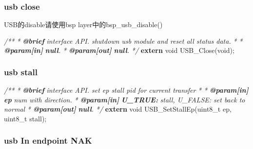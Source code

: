 \documentclass[
  12pt,
]{book}
\newenvironment{Shaded}{\begin{snugshade}}{\end{snugshade}}
\newcommand{\AnnotationTok}[1]{\textcolor[rgb]{0.56,0.35,0.01}{\textbf{\textit{#1}}}}
\newcommand{\CommentTok}[1]{\textcolor[rgb]{0.56,0.35,0.01}{\textit{#1}}}
\newcommand{\CommentVarTok}[1]{\textcolor[rgb]{0.56,0.35,0.01}{\textbf{\textit{#1}}}}
\newcommand{\DataTypeTok}[1]{\textcolor[rgb]{0.13,0.29,0.53}{#1}}
\newcommand{\KeywordTok}[1]{\textcolor[rgb]{0.13,0.29,0.53}{\textbf{#1}}}
\newcommand{\NormalTok}[1]{#1}
\begin{document}
\hypertarget{usb-close}{%
\subsubsection{usb close}\label{usb-close}}

USB的disable请使用bsp layer中的bsp\_usb\_disable()

\begin{Shaded}
\begin{Highlighting}[]
\CommentTok{/**}
\CommentTok{ * }\AnnotationTok{@brief}\CommentTok{ interface API. shutdown usb module and reset all status data.}
\CommentTok{ *}
\CommentTok{ * }\AnnotationTok{@param[in]}\CommentTok{ }\CommentVarTok{null}\CommentTok{. }
\CommentTok{ * }\AnnotationTok{@param[out]}\CommentTok{ }\CommentVarTok{null}\CommentTok{. }
\CommentTok{ */}
\KeywordTok{extern} \DataTypeTok{void}\NormalTok{ USB_Close(}\DataTypeTok{void}\NormalTok{);}
\end{Highlighting}
\end{Shaded}

\hypertarget{usb-stall}{%
\subsubsection{usb stall}\label{usb-stall}}

\begin{Shaded}
\begin{Highlighting}[]
\CommentTok{/**}
\CommentTok{ * }\AnnotationTok{@brief}\CommentTok{ interface API. set ep stall pid for current transfer}
\CommentTok{ *}
\CommentTok{ * }\AnnotationTok{@param[in]}\CommentTok{ }\CommentVarTok{ep}\CommentTok{ num with direction. }
\CommentTok{ * }\AnnotationTok{@param[in]}\CommentTok{ }\CommentVarTok{U_TRUE:}\CommentTok{ stall, U_FALSE: set back to normal }
\CommentTok{ * }\AnnotationTok{@param[out]}\CommentTok{ }\CommentVarTok{null}\CommentTok{. }
\CommentTok{ */}
\KeywordTok{extern} \DataTypeTok{void}\NormalTok{ USB_SetStallEp(}\DataTypeTok{uint8_t}\NormalTok{ ep, }\DataTypeTok{uint8_t}\NormalTok{ stall);}
\end{Highlighting}
\end{Shaded}

\hypertarget{usb-in-endpoint-nak}{%
\subsubsection{usb In endpoint NAK}\label{usb-in-endpoint-nak}}
\end{document}

